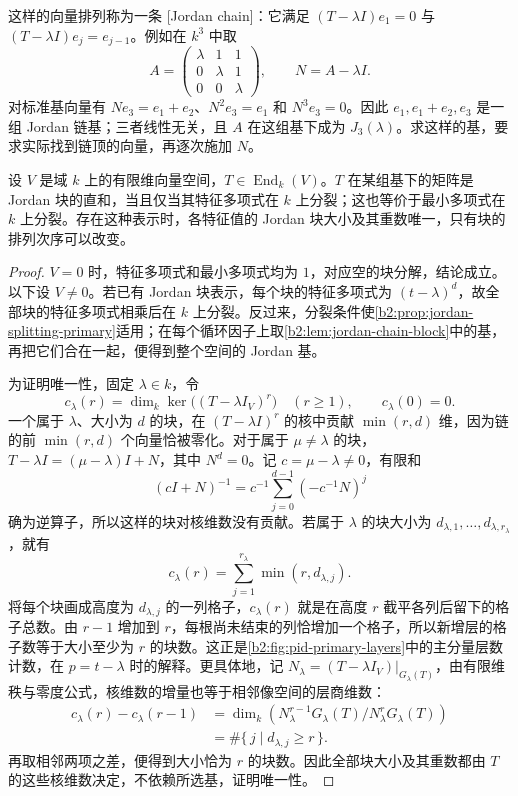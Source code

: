 这样的向量排列称为一条 [Jordan chain]：它满足 \((T-\lambda I)e_1=0\) 与 \((T-\lambda I)e_j=e_{j-1}\)。例如在 \(k^3\) 中取
\[
	A=\begin{pmatrix}
		\lambda&1&1\\
		0&\lambda&1\\
		0&0&\lambda
	\end{pmatrix},\qquad N=A-\lambda I.
\]
对标准基向量有 \(Ne_3=e_1+e_2\)、\(N^2e_3=e_1\) 和 \(N^3e_3=0\)。因此 \(e_1,e_1+e_2,e_3\) 是一组 Jordan 链基；三者线性无关，且 \(A\) 在这组基下成为 \(J_3(\lambda)\)。求这样的基，要求实际找到链顶的向量，再逐次施加 \(N\)。

\begin{theorem}\label{b2:thm:jordan-canonical-form}
	设 \(V\) 是域 \(k\) 上的有限维向量空间，\(T\in\operatorname{End}_k(V)\)。\(T\) 在某组基下的矩阵是 Jordan 块的直和，当且仅当其特征多项式在 \(k\) 上分裂；这也等价于最小多项式在 \(k\) 上分裂。存在这种表示时，各特征值的 Jordan 块大小及其重数唯一，只有块的排列次序可以改变。
\end{theorem}
\begin{proof}
	\(V=0\) 时，特征多项式和最小多项式均为 \(1\)，对应空的块分解，结论成立。以下设 \(V\ne0\)。若已有 Jordan 块表示，每个块的特征多项式为 \((t-\lambda)^d\)，故全部块的特征多项式相乘后在 \(k\) 上分裂。反过来，分裂条件使\cref{b2:prop:jordan-splitting-primary}适用；在每个循环因子上取\cref{b2:lem:jordan-chain-block}中的基，再把它们合在一起，便得到整个空间的 Jordan 基。

	为证明唯一性，固定 \(\lambda\in k\)，令
	\[
		c_\lambda(r)=\dim_k\ker\bigl((T-\lambda I_V)^r\bigr)\quad(r\ge1), \qquad c_\lambda(0)=0.
	\]
	一个属于 \(\lambda\)、大小为 \(d\) 的块，在 \((T-\lambda I)^r\) 的核中贡献 \(\min(r,d)\) 维，因为链的前 \(\min(r,d)\) 个向量恰被零化。对于属于 \(\mu\ne\lambda\) 的块，\(T-\lambda I=(\mu-\lambda)I+N\)，其中 \(N^d=0\)。记 \(c=\mu-\lambda\ne0\)，有限和
	\[
		(cI+N)^{-1}=c^{-1}\sum_{j=0}^{d-1}(-c^{-1}N)^j
	\]
	确为逆算子，所以这样的块对核维数没有贡献。若属于 \(\lambda\) 的块大小为 \(d_{\lambda,1},\ldots,d_{\lambda,r_\lambda}\)，就有
	\begin{equation}\label{b2:eq:jordan-kernel-dimensions}
		c_\lambda(r)=\sum_{j=1}^{r_\lambda}\min(r,d_{\lambda,j}).
	\end{equation}
	将每个块画成高度为 \(d_{\lambda,j}\) 的一列格子，\(c_\lambda(r)\) 就是在高度 \(r\) 截平各列后留下的格子总数。由 \(r-1\) 增加到 \(r\)，每根尚未结束的列恰增加一个格子，所以新增层的格子数等于大小至少为 \(r\) 的块数。这正是\cref{b2:fig:pid-primary-layers}中的主分量层数计数，在 \(p=t-\lambda\) 时的解释。更具体地，记 \(N_\lambda=(T-\lambda I_V)|_{G_\lambda(T)}\)，由有限维秩与零度公式，核维数的增量也等于相邻像空间的层商维数：
	\[
		\begin{aligned}
			c_\lambda(r)-c_\lambda(r-1) &=\dim_k\left(N_\lambda^{r-1}G_\lambda(T)/N_\lambda^rG_\lambda(T)\right)\\
			&=\#\{\,j\mid d_{\lambda,j}\ge r\,\}.
		\end{aligned}
	\]
	再取相邻两项之差，便得到大小恰为 \(r\) 的块数。因此全部块大小及其重数都由 \(T\) 的这些核维数决定，不依赖所选基，证明唯一性。
\end{proof}

